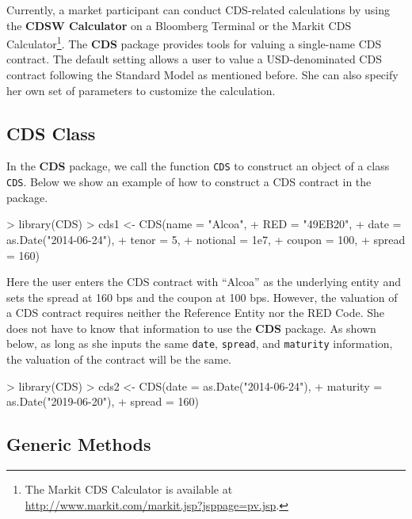 \documentclass{jss}
\begin{document}
Currently, a market participant can conduct CDS-related calculations by using the \textbf{CDSW Calculator} on a Bloomberg Terminal or the Markit CDS Calculator\footnote{The Markit CDS Calculator is available
  at \url{http://www.markit.com/markit.jsp?jsppage=pv.jsp}.}. The \textbf{CDS} package provides tools for valuing a single-name CDS contract. The default setting allows a user to value a USD-denominated CDS contract following the Standard Model as mentioned before. She can also specify her own set of parameters to customize the calculation. 

\subsection{CDS Class}
\label{class:CDS}

In the \textbf{CDS} package, we call the function \texttt{CDS} to construct an object of a class \texttt{CDS}. Below we show an example of how to construct a CDS contract in the package.

\begin{Schunk}
\begin{Sinput}
> library(CDS)
> cds1 <- CDS(name     = "Alcoa",
+             RED      = "49EB20",
+             date     = as.Date("2014-06-24"),
+             tenor    = 5,
+             notional = 1e7,
+             coupon   = 100,
+             spread   = 160)
\end{Sinput}
\end{Schunk}

Here the user enters the CDS contract with ``Alcoa'' as the underlying entity and sets the spread at 160 bps and the coupon at 100 bps. However, the valuation of a CDS contract requires neither the Reference Entity nor the RED Code. She does not have to know that information to use the \textbf{CDS} package. As shown below, as long as she inputs the same \texttt{date}, \texttt{spread}, and \texttt{maturity} information, the valuation of the contract will be the same.

\begin{Schunk}
\begin{Sinput}
> library(CDS)
> cds2 <- CDS(date     = as.Date("2014-06-24"),
+             maturity = as.Date("2019-06-20"),
+             spread   = 160)
\end{Sinput}
\end{Schunk}

\subsection{Generic Methods}
\label{sec:GenericMethods}
\end{document}
